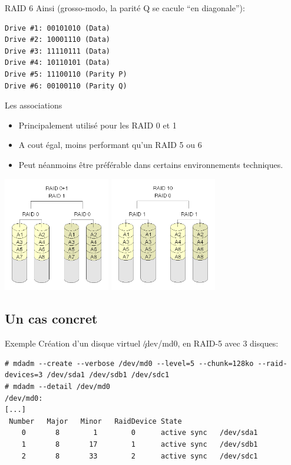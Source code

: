 \begin{frame}[fragile=singleslide]{RAID 6}
  Ainsi (grosso-modo, la parité Q se cacule ``en diagonale''):
  \begin{lstlisting} 
Drive #1: 00101010 (Data)
Drive #2: 10001110 (Data)
Drive #3: 11110111 (Data)
Drive #4: 10110101 (Data)
Drive #5: 11100110 (Parity P)
Drive #6: 00100110 (Parity Q)
  \end{lstlisting} 
\end{frame}

\begin{frame}[fragile=singleslide]{Les associations}
  \begin{itemize} 
  \item Principalement utilisé pour les RAID 0 et 1
  \item A cout égal, moins performant qu'un RAID 5 ou 6
  \item  Peut néanmoins être  préférable dans  certains environnements
    techniques.
  \end{itemize} 
  \begin{center}
    \includegraphics[height=5cm]{pics/RAID_01}
    \includegraphics[height=5cm]{pics/RAID_10}
  \end{center}
\end{frame}

\subsection{Un cas concret}

\begin{frame}[fragile=singleslide]{Exemple}
  Création d'un disque virtuel \c{/dev/md0}, en RAID-5 avec 3 disques:
  \begin{lstlisting} 
# mdadm --create --verbose /dev/md0 --level=5 --chunk=128ko --raid-devices=3 /dev/sda1 /dev/sdb1 /dev/sdc1
# mdadm --detail /dev/md0
/dev/md0:
[...]
 Number   Major   Minor   RaidDevice State
    0       8        1        0      active sync   /dev/sda1
    1       8       17        1      active sync   /dev/sdb1
    2       8       33        2      active sync   /dev/sdc1
  \end{lstlisting}
\end{frame}

